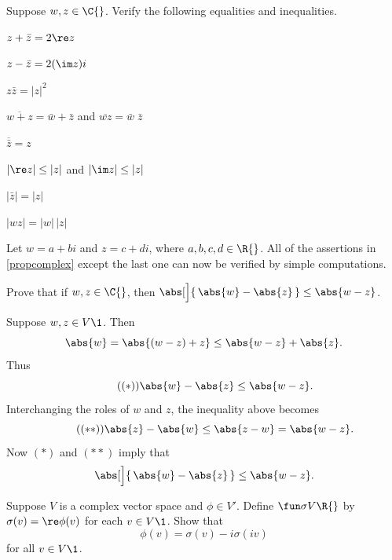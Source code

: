 
\exercise
Suppose $w, z \in \C{}$. Verify the following equalities and inequalities.
\begin{subtheorem} \addtolength{\itemsep}{2bp}
\item
$z + \bar{z} = 2 \re z$

\item
$z - \bar{z} = 2( \im z)i$

\item
$z \bar{z} = |z|^2$

\item
$\overline{w + z} = \bar{w} + \bar{z}$  and $\overline{wz} = \bar{w} \; \bar{z}$

\item
$\overline{\bar{z}} = z$

\item
$| \re z | \le |z|$ and $| \im z | \le |z|$

\item
$|\bar{z}| = |z|$

\item
$|wz| = |w|\,|z|$
\end{subtheorem}

\begin{Solution}
Let $w = a + bi$ and $z = c + di$, where $a, b, c, d \in \R{}$. All of the assertions in \ref{propcomplex} except the last one can now be verified by simple computations.
\end{Solution}

\exercise
Prove that if $w, z \in \C{}$, then $\abs[\Big]{\, \abs{w} - \abs{z} \,} \le \abs{w-z}$. \label{4reverse}

\begin{Solution}
Suppose $w, z \in V\1$. Then
\[
\abs{w} = \abs{(w-z) + z} \le \abs{w-z} + \abs{z}.
\]
Thus
\[ \tag{$(*)$}
\abs{w} - \abs{z} \le \abs{w-z}.
\]
Interchanging the roles of $w$ and $z$, the inequality above becomes
\[ \tag{$(**)$}
\abs{z} - \abs{w} \le \abs{z-w} = \abs{w-z}.
\]
Now $(*)$ and $(**)$ imply that
\[
\abs[\Big]{\, \abs{w} - \abs{z} \,} \le \abs{w-z}.
\]
\end{Solution}

\exercise
Suppose $V$ is a complex vector space and $\phi \in V'\!$. Define $\fun \sigma V {\R{}}$ by
$\sigma(v) = \re \phi(v)$ for each $v \in V\1$. Show that
\[
\phi(v) = \sigma(v) - i \sigma(iv)
\]
for all $v \in V\1$.

